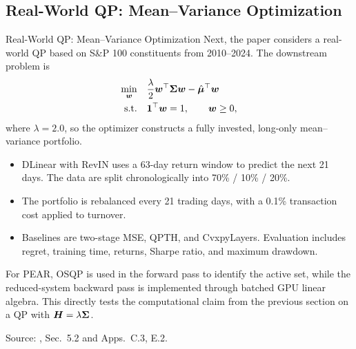 \subsection{Real-World QP: Mean--Variance Optimization}

\begin{frame}{Real-World QP: Mean--Variance Optimization}
    Next, the paper considers a real-world QP based on S\&P 100 constituents from 2010--2024. The downstream problem is
    \begin{equation}
        \begin{aligned}
            \min_{{\bm{w}}}\quad & \frac{\lambda}{2}{\bm{w}}^\top{\bm{\Sigma}}{\bm{w}}-\hat{{\bm{\mu}}}^\top{\bm{w}}\\
            \text{s.t.}\quad & \bm{1}^\top{\bm{w}}=1,\qquad {\bm{w}}\geq0,
        \end{aligned}
    \end{equation}
    where $\lambda=2.0$, so the optimizer constructs a fully invested, long-only mean--variance portfolio.

    \begin{itemize}
        \item DLinear with RevIN uses a 63-day return window to predict the next 21 days. The data are split chronologically into 70\% / 10\% / 20\%.
        \item The portfolio is rebalanced every 21 trading days, with a 0.1\% transaction cost applied to turnover.
        \item Baselines are two-stage MSE, QPTH, and CvxpyLayers. Evaluation includes regret, training time, returns, Sharpe ratio, and maximum drawdown.
    \end{itemize}

    For PEAR, OSQP is used in the forward pass to identify the active set, while the reduced-system backward pass is implemented through batched GPU linear algebra. This directly tests the computational claim from the previous section on a QP with ${\bm{H}}=\lambda{\bm{\Sigma}}$.

    \vfill
    {\tiny Source: \citet{lee2026decisionfocusedlearningtangentspaceprojection}, Sec.~5.2 and Apps.~C.3, E.2.}
\end{frame}


